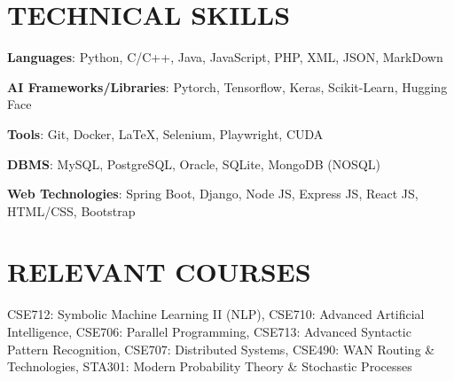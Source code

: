 \documentclass[letterpaper,10.5pt]{article}
\begin{document}
\section{TECHNICAL SKILLS}
\vspace{-0.5pt}
\begin{itemize}[leftmargin=0in, label={}, parsep=-2pt]
  \small{\item{
                \textbf{Languages}{: Python, C/C++, Java, JavaScript, PHP, XML, JSON, MarkDown}}
    \item{\textbf{AI Frameworks/Libraries}{: Pytorch, Tensorflow, Keras, Scikit-Learn, Hugging Face}}
    \item{\textbf{Tools}{: Git, Docker, \LaTeX, Selenium, Playwright, CUDA}}
    \item{\textbf{DBMS}{: MySQL, PostgreSQL, Oracle, SQLite, MongoDB (NOSQL)}}
    \item{\textbf{Web Technologies}{: Spring Boot, Django, Node JS, Express JS, React JS, HTML/CSS, Bootstrap}}
  }
\end{itemize}
\vspace{-16pt}

\section{RELEVANT COURSES}
CSE712: Symbolic Machine Learning II (NLP),
CSE710: Advanced Artificial Intelligence,
CSE706: Parallel Programming,
CSE713: Advanced Syntactic Pattern Recognition,
CSE707: Distributed Systems,
CSE490: WAN Routing \& Technologies,
STA301: Modern Probability Theory \& Stochastic Processes


\vspace{-8pt}
\end{document}
